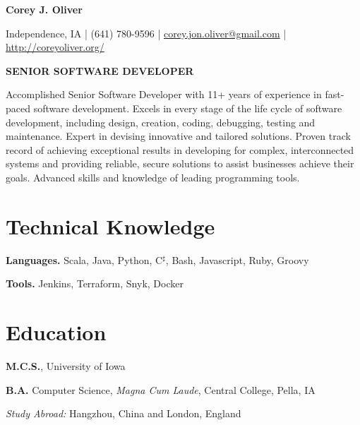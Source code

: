 \documentclass[10pt,letterpaper]{article}
\def\name{Corey J. Oliver}
\renewenvironment{itemize}{
  \begin{list}{}{
      \setlength{\leftmargin}{1.5em}
      \setlength{\itemsep}{0.25em}
      \setlength{\parskip}{0pt}
      \setlength{\parsep}{0.25em}
    }
  }{
  \end{list}
}
\begin{document}

\centerline{\huge \bf \name}

\bigskip

\centerline{Independence, IA | (641) 780-9596 | %
\href{mailto:corey.jon.oliver@gmail.com}{corey.jon.oliver@gmail.com} |
\href{http://coreyoliver.org/}{http://coreyoliver.org/}}

\hrulefill{}

\bigskip

\centerline{\bf SENIOR SOFTWARE DEVELOPER}

\bigskip

\noindent
Accomplished Senior Software Developer with 11+ years of experience in
fast-paced software development. Excels in every stage of the life cycle of
software development, including design, creation, coding, debugging, testing and
maintenance. Expert in devising innovative and tailored solutions. Proven track
record of achieving exceptional results in developing for complex,
interconnected systems and providing reliable, secure solutions to assist
businesses achieve their goals. Advanced skills and knowledge of leading
programming tools.

\section*{Technical Knowledge}
\begin{itemize}
\item \textbf{Languages.} Scala, Java, Python, C$^\sharp$, Bash,
  Javascript, Ruby, Groovy
\item \textbf{Tools.} Jenkins, Terraform, Snyk, Docker
\end{itemize}

\section*{Education}

\begin{itemize}
\item \textbf{M.C.S.}, University of Iowa
\item \textbf{B.A.} Computer Science, \textit{Magna Cum Laude}, Central
  College, Pella, IA
  \begin{itemize}
  \item \textit{Study Abroad:} Hangzhou, China and
    London, England
  \end{itemize}
\end{itemize}
\end{document}
